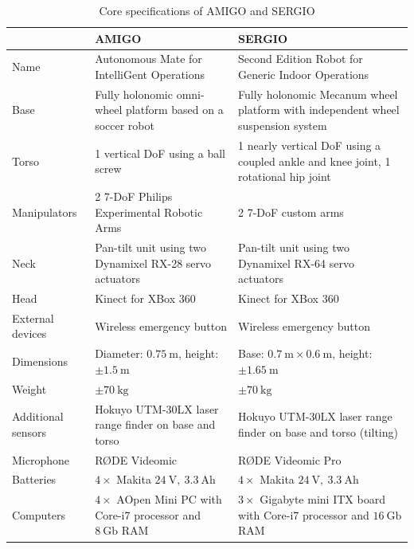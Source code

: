 \begin{table}[H]
    \begin{center}
    \caption{Core specifications of AMIGO and SERGIO}
    \label{tab:hardwarespec}
    \renewcommand{\arraystretch}{1.0}
    \setlength{\tabcolsep}{5pt}
        \begin{tabular}{p{} p{} p{}}
            \toprule
            & AMIGO & SERGIO\\
            \midrule
            Name & Autonomous Mate for IntelliGent Operations & Second Edition Robot for Generic Indoor Operations \\
            Base & Fully holonomic omni-wheel platform based on a soccer robot & Fully holonomic Mecanum wheel platform with independent wheel suspension system\\
            Torso & 1 vertical DoF using a ball screw & 1 nearly vertical DoF using a coupled ankle and knee joint, 1 rotational hip joint\\
            Manipulators & 2 7-DoF Philips Experimental Robotic Arms & 2 7-DoF custom arms \\
            Neck & Pan-tilt unit using two Dynamixel RX-28 servo actuators & Pan-tilt unit using two Dynamixel RX-64 servo actuators \\
            Head & Kinect for XBox 360 & Kinect for XBox 360 \\
            External devices & Wireless emergency button & Wireless emergency button \\
            Dimensions & Diameter: $0.75\ \mathrm{m}$, height: $\pm1.5\ \mathrm{m}$ & Base: $0.7\ \mathrm{m}\times0.6\ \mathrm{m}$, height: $\pm1.65\ \mathrm{m}$\\
            Weight & $\pm70\ \mathrm{kg}$ & $\pm70\ \mathrm{kg}$ \\
            Additional sensors & Hokuyo UTM-30LX laser range finder on base and torso & Hokuyo UTM-30LX laser range finder on base and torso (tilting) \\
            Microphone & R{\O}DE Videomic & R{\O}DE Videomic Pro\\
            Batteries & $4\times$ Makita $24\ \mathrm{V},\ 3.3\ \mathrm{Ah}$ & $4\times$ Makita $24\ \mathrm{V},\ 3.3\ \mathrm{Ah}$\\
            Computers & $4\times$ AOpen Mini PC with Core-i7 processor and $8\ \mathrm{Gb}$ RAM & $3\times$ Gigabyte mini ITX board with Core-i7 processor and 	$16\ \mathrm{Gb}$ RAM \\
            \bottomrule
        \end{tabular}
    \end{center}
\end{table}